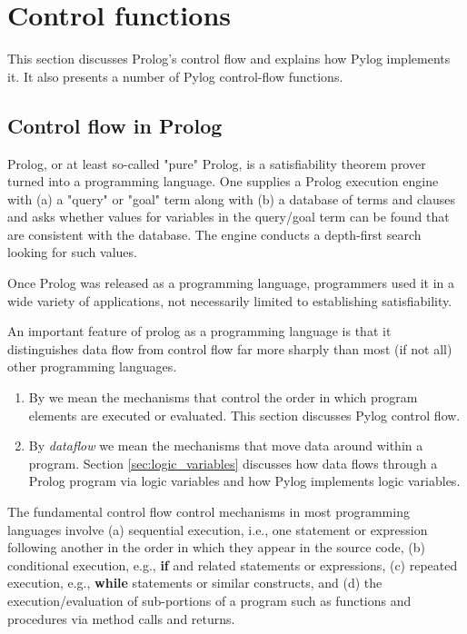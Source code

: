 \section{Control functions}\label{sec:control}
This section discusses Prolog's control flow and explains how Pylog implements it. It also presents a number of Pylog control-flow functions.

\subsection{Control flow in Prolog}
Prolog, or at least so-called "pure" Prolog, is a satisfiability theorem prover turned into a programming language. One supplies a Prolog execution engine with (a) a "query" or "goal" term along with (b) a database of terms and clauses and asks whether values for variables in the query/goal term can be found that are consistent with the database. The engine conducts a depth-first search looking for such values. 

Once Prolog was released as a programming language, programmers used it in a wide variety of applications, not necessarily limited to establishing satisfiability. 

An important feature of prolog as a programming language is that it distinguishes data flow from control flow far more sharply than most (if not all) other programming languages. 
\begin{enumerate}
    \item By  we mean the mechanisms that control the order in which program elements are executed or evaluated. This section discusses Pylog control flow.

    \item By \textit{dataflow} we mean the mechanisms that move data around within a program. Section \ref{sec:logic_variables} discusses how data flows through a Prolog program via logic variables and how Pylog implements logic variables.
\end{enumerate}

The fundamental control flow control mechanisms in most programming languages involve (a) sequential execution, i.e., one statement or expression following another in the order in which they appear in the source code, (b) conditional execution, e.g., \textbf{if} and related statements or expressions, (c) repeated execution, e.g., \textbf{while} statements or similar constructs, and (d) the execution/evaluation of sub-portions of a program such as functions and procedures via method calls and returns. 

